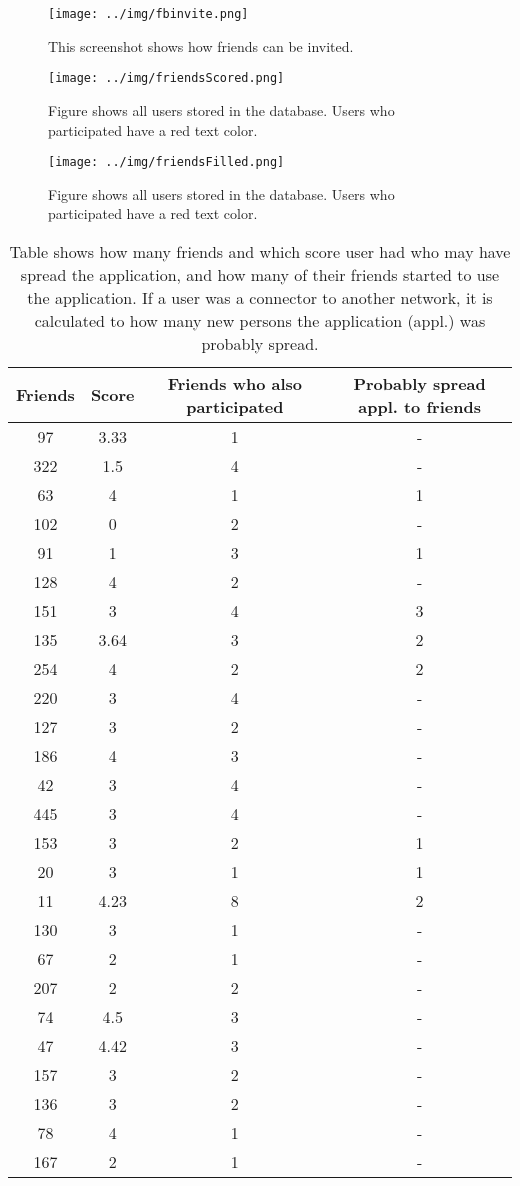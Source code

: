 \documentclass[preprint,12pt]{elsarticle}
\begin{document}
\begin{figure}
  \texttt{[image: ../img/fbinvite.png]}
  \caption{This screenshot shows how friends can be invited.}
\label{fig:invite}
\end{figure}

\begin{figure}
  \texttt{[image: ../img/friendsScored.png]}
\caption{Figure shows all users stored in the database. Users who
  participated have a red text color.}
\label{fig:friendsScored}
\end{figure}

\begin{figure}
  \texttt{[image: ../img/friendsFilled.png]}
\caption{Figure shows all users stored in the database. Users who
  participated have a red text color.}
\label{fig:friendsFilled}
\end{figure}


 \begin{table}
 \label{tab:spread}
 \begin{tabular}{ c c c c}
Friends & Score & Friends who also participated & Probably spread appl. to friends\\
\hline
97 & 3.33 & 1 &-\\
322 & 1.5 & 4 & -\\
63 & 4 & 1 & 1\\
102 & 0 & 2 & -\\
91 & 1 & 3 &1\\
128 & 4 & 2 & -\\
151 & 3 & 4 &3\\
135 & 3.64 & 3 &2\\
254 & 4 & 2 & 2\\
220 & 3 & 4 & -\\
127 & 3 & 2 & -\\
186 & 4 & 3 & -\\
42 & 3 & 4 & - \\
445 & 3 & 4 & - \\
153 & 3 & 2 &1\\
20 & 3 & 1 &1\\
11 & 4.23 & 8 &2\\
130 & 3 & 1 & -\\
67 & 2 & 1 & - \\
207 & 2 & 2 & -\\
74 & 4.5 & 3 & -\\
47 & 4.42 & 3& -\\
157 & 3 & 2 & -\\
136 & 3 & 2 & -\\
78 & 4 & 1 & -\\
167 & 2 &1 & -
\end{tabular}
\caption{Table shows how many friends and which score user had who may have spread the
  application, and how many of their friends started to use the
  application. If a user was a connector to another network, it is
  calculated to how many new persons the application (appl.) was
  probably spread.}
\end{table}
\end{document}
